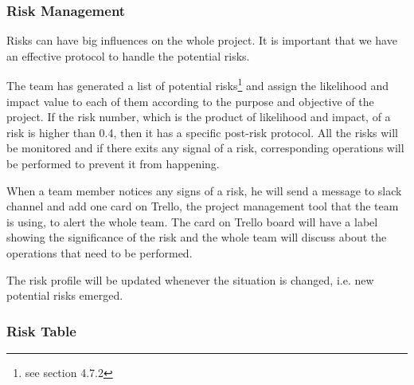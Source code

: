 \subsubsection{Risk Management}
Risks can have big influences on the whole project. It is important that we have an effective protocol to handle the potential risks.

The team has generated a list of potential risks\footnote{see section 4.7.2} and assign the likelihood and impact value to each of them according to the purpose and objective of the project. If the risk number, which is the product of likelihood and impact, of a risk is higher than 0.4, then it has a specific post-risk protocol. All the risks will be monitored and if there exits any signal of a risk, corresponding operations will be performed to prevent it from happening.

When a team member notices any signs of a risk, he will send a message to slack channel and add one card on Trello, the project management tool that the team is using, to alert the whole team. The card on Trello board will have a label showing the significance of the risk and the whole team will discuss about the operations that need to be performed.

The risk profile will be updated whenever the situation is changed, i.e. new potential risks emerged. 


\subsubsection{Risk Table}


